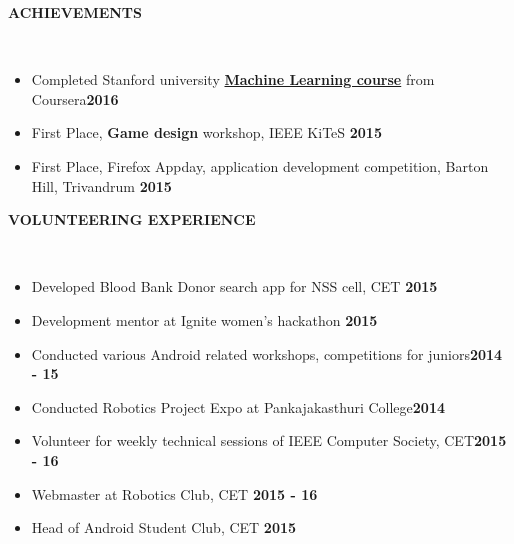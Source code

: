 \documentclass[a4paper,10pt]{article}
\newcommand{\lsep}{-0.5cm}
\newcommand{\resheading}[1]{{\small \colorbox{mygrey}{\begin{minipage}{0.975\textwidth}{\textbf{\uppercase{#1} \vphantom{p\^{E}}}}\end{minipage}}}}
\newcommand{\when}[1]{\hfill \textbf{#1}}
\newenvironment{noSepItemize}
{ \begin{itemize}
    \setlength{\itemsep}{1pt}
    \setlength{\parskip}{0pt}
    \setlength{\parsep}{0pt}     }
{ \end{itemize}                  }
\begin{document}
\resheading{\textbf{Achievements} }\\[\lsep]
\begin{noSepItemize}
	\item \noindent Completed Stanford university \textbf{\href{https://www.coursera.org/account/accomplishments/records/EJQWCKEBUSBD}{Machine Learning course}} from Coursera\when{2016}
	\item \noindent First Place, \textbf{Game design} workshop, IEEE KiTeS \when{2015}
	\item \noindent First Place, Firefox Appday, application development competition, Barton Hill, Trivandrum \when{2015}
\end{noSepItemize}

\resheading{\textbf{Volunteering Experience} }\\[\lsep]
\begin{noSepItemize}
	\item \noindent Developed Blood Bank Donor search app for NSS cell, CET \when{2015}
	\item \noindent Development mentor at Ignite women's hackathon \when{2015}
	\item \noindent Conducted various Android related workshops, competitions for juniors\when{2014 - 15}
	\item \noindent Conducted Robotics Project Expo at Pankajakasthuri College\when{2014}
	\item \noindent Volunteer for weekly technical sessions of IEEE Computer Society, CET\when{2015 - 16}
	\item \noindent Webmaster at Robotics Club, CET \when{2015 - 16}
	\item \noindent Head of Android Student Club, CET \when{2015}
\end{noSepItemize}

\end{document}
